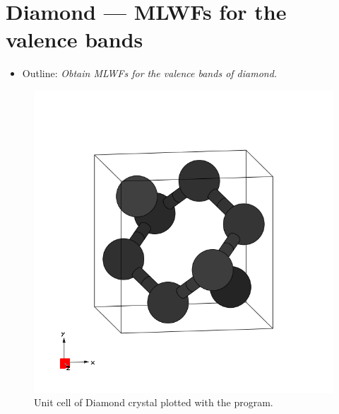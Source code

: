 \section{Diamond --- MLWFs for the valence bands}
\label{sec5:diamond}
\begin{itemize}
\item Outline: {\it Obtain MLWFs for the valence bands of diamond.}
\end{itemize}

\begin{figure}[h!]
\centering
\includegraphics[width=0.25\columnwidth,trim={45pt 45pt 55pt 55pt},clip]{figure/example05/diamond.png}
\caption{Unit cell of Diamond crystal plotted with the \xcrysden{} program.}
\label{fig5.0}
\end{figure}


